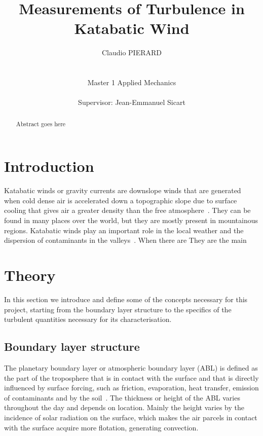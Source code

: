 \documentclass[a4paper,12pt]{article}
\title{Measurements of Turbulence in Katabatic Wind}
\author{Claudio PIERARD \\
\\
\\
Master 1 Applied Mechanics\\
\\
Supervisor: Jean-Emmanuel Sicart}
\begin{document}
\renewcommand{\labelitemi}{$\bullet$}

\maketitle
\begin{abstract}
    Abstract goes here
\end{abstract}

\newpage

\tableofcontents

\newpage

\section{Introduction}

Katabatic winds or gravity currents are downslope winds that are generated when cold dense air is accelerated down a topographic slope due to surface cooling that gives air a greater density than the free atmosphere~\citep{poulos2008observational}. They can be found in many places over the world, but they are mostly present in mountainous regions.
Katabatic winds play an important role in the local weather and the dispersion of contaminants in the valleys~\citep{largeron2016persistent}. When there are They are the main 

\section{Theory}

In this section we introduce and define some of the concepts necessary for this project, starting from the boundary layer structure to the specifics of the turbulent quantities necessary for its characterisation.

\subsection{Boundary layer structure}
The planetary boundary layer or atmospheric boundary layer (ABL) is defined as the part of the troposphere that is in contact with the surface and that is directly influenced by surface forcing, such as friction, evaporation, heat transfer, emission of contaminants and by the soil~\citep{stull2012introduction}. The thickness or height of the ABL varies throughout the day and depends on location. Mainly the height varies by the incidence of solar radiation on the surface, which makes the air parcels in contact with the surface acquire more flotation, generating convection.
\end{document}
